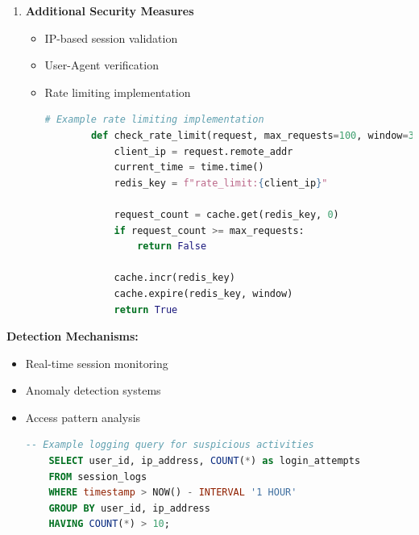 \documentclass[12pt]{article}
\begin{document}
\begin{enumerate}
    \item \textbf{Additional Security Measures}
    \begin{itemize}
        \item IP-based session validation
        \item User-Agent verification
        \item Rate limiting implementation
        \begin{lstlisting}[language=Python]
        # Example rate limiting implementation
        def check_rate_limit(request, max_requests=100, window=3600):
            client_ip = request.remote_addr
            current_time = time.time()
            redis_key = f"rate_limit:{client_ip}"
            
            request_count = cache.get(redis_key, 0)
            if request_count >= max_requests:
                return False
            
            cache.incr(redis_key)
            cache.expire(redis_key, window)
            return True
        \end{lstlisting}
    \end{itemize}
\end{enumerate}

\textbf{Detection Mechanisms:}
\begin{itemize}
    \item Real-time session monitoring
    \item Anomaly detection systems
    \item Access pattern analysis
    \begin{lstlisting}[language=SQL]
    -- Example logging query for suspicious activities
    SELECT user_id, ip_address, COUNT(*) as login_attempts
    FROM session_logs
    WHERE timestamp > NOW() - INTERVAL '1 HOUR'
    GROUP BY user_id, ip_address
    HAVING COUNT(*) > 10;
    \end{lstlisting}
\end{itemize}
\end{document}
